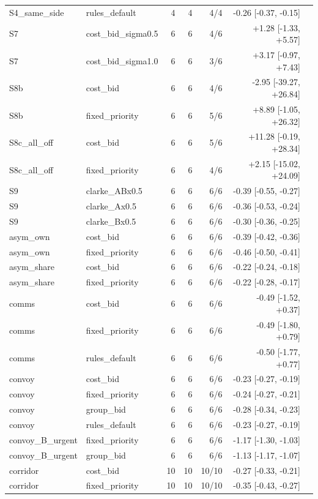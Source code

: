 \documentclass[journal,onecolumn]{IEEEtran}
\begin{document}
{\begin{longtable}{@{}llrrrrl@{}}
S4\_same\_side & rules\_default & 4 & 4 & 4/4 & -0.26 [-0.37, -0.15] \\
S7 & cost\_bid\_sigma0.5 & 6 & 6 & 4/6 & +1.28 [-1.33, +5.57] \\
S7 & cost\_bid\_sigma1.0 & 6 & 6 & 3/6 & +3.17 [-0.97, +7.43] \\
S8b & cost\_bid & 6 & 6 & 4/6 & -2.95 [-39.27, +26.84] \\
S8b & fixed\_priority & 6 & 6 & 5/6 & +8.89 [-1.05, +26.32] \\
S8c\_all\_off & cost\_bid & 6 & 6 & 5/6 & +11.28 [-0.19, +28.34] \\
S8c\_all\_off & fixed\_priority & 6 & 6 & 4/6 & +2.15 [-15.02, +24.09] \\
S9 & clarke\_ABx0.5 & 6 & 6 & 6/6 & -0.39 [-0.55, -0.27] \\
S9 & clarke\_Ax0.5 & 6 & 6 & 6/6 & -0.36 [-0.53, -0.24] \\
S9 & clarke\_Bx0.5 & 6 & 6 & 6/6 & -0.30 [-0.36, -0.25] \\
asym\_own & cost\_bid & 6 & 6 & 6/6 & -0.39 [-0.42, -0.36] \\
asym\_own & fixed\_priority & 6 & 6 & 6/6 & -0.46 [-0.50, -0.41] \\
asym\_share & cost\_bid & 6 & 6 & 6/6 & -0.22 [-0.24, -0.18] \\
asym\_share & fixed\_priority & 6 & 6 & 6/6 & -0.22 [-0.28, -0.17] \\
comms & cost\_bid & 6 & 6 & 6/6 & -0.49 [-1.52, +0.37] \\
comms & fixed\_priority & 6 & 6 & 6/6 & -0.49 [-1.80, +0.79] \\
comms & rules\_default & 6 & 6 & 6/6 & -0.50 [-1.77, +0.77] \\
convoy & cost\_bid & 6 & 6 & 6/6 & -0.23 [-0.27, -0.19] \\
convoy & fixed\_priority & 6 & 6 & 6/6 & -0.24 [-0.27, -0.21] \\
convoy & group\_bid & 6 & 6 & 6/6 & -0.28 [-0.34, -0.23] \\
convoy & rules\_default & 6 & 6 & 6/6 & -0.23 [-0.27, -0.19] \\
convoy\_B\_urgent & fixed\_priority & 6 & 6 & 6/6 & -1.17 [-1.30, -1.03] \\
convoy\_B\_urgent & group\_bid & 6 & 6 & 6/6 & -1.13 [-1.17, -1.07] \\
corridor & cost\_bid & 10 & 10 & 10/10 & -0.27 [-0.33, -0.21] \\
corridor & fixed\_priority & 10 & 10 & 10/10 & -0.35 [-0.43, -0.27] \\

\end{longtable}}
\end{document}
